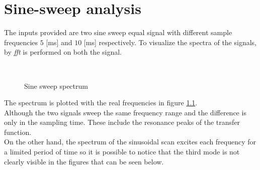 \chapter{Sine-sweep analysis}
\label{chap:sinesweep}
The inputs provided are two sine sweep equal signal with different sample
frequencies \(5\) [\si{\milli\second}] and \(10\) [\si{\milli\second}] 
respectively.
To visualize the spectra of the signals, by \emph{fft} is performed on both the
signal.
\begin{figure}[htb]
	\centering
		\,
	\caption{Sine sweep spectrum}
	\label{fig:spectral}
\end{figure}
%
The spectrum is plotted with the real frequencies in figure \ref{fig:spectral}.\\
Although the two signals sweep the same frequency range and the difference is
only in the sampling time. These include the resonance peaks of the transfer
function.\\
On the other hand, the spectrum of the sinusoidal scan excites each frequency
for a limited period of time so it is possible to notice that the third mode is
not clearly visible in the figures that can be seen below.
%
